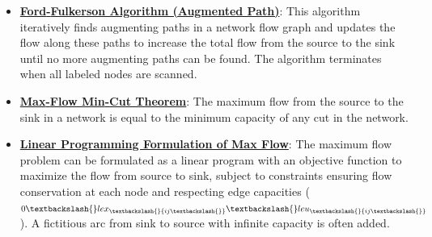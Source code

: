 \documentclass{article}%
\begin{document}
\begin{itemize}[leftmargin=*]%
\item \href{https://www.math.purdue.edu/~yipn/421/2024-11-19-MaxFlowMinCut.pdf#page=12}{\textbf{Ford{-}Fulkerson Algorithm (Augmented Path)}}: This algorithm iteratively finds augmenting paths in a network flow graph and updates the flow along these paths to increase the total flow from the source to the sink until no more augmenting paths can be found. The algorithm terminates when all labeled nodes are scanned.%
\item \href{https://www.math.purdue.edu/~yipn/421/2024-11-19-MaxFlowMinCut.pdf#page=4}{\textbf{Max{-}Flow Min{-}Cut Theorem}}: The maximum flow from the source to the sink in a network is equal to the minimum capacity of any cut in the network.%
\item \href{https://www.math.purdue.edu/~yipn/421/2024-11-19-MaxFlowMinCut.pdf#page=14}{\textbf{Linear Programming Formulation of Max Flow}}: The maximum flow problem can be formulated as a linear program with an objective function to maximize the flow from source to sink, subject to constraints ensuring flow conservation at each node and respecting edge capacities ($0 \textbackslash{}le x_\textbackslash{}{ij\textbackslash{}} \textbackslash{}le u_\textbackslash{}{ij\textbackslash{}}$). A fictitious arc from sink to source with infinite capacity is often added.%
\end{itemize}

%
\end{document}
